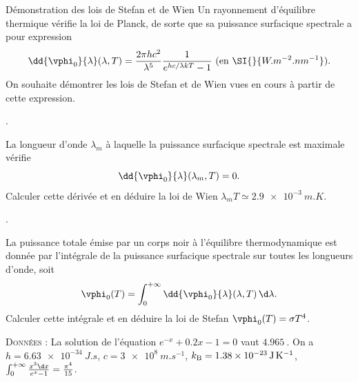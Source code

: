 \begin{exo}[PC][3][TD]{Démonstration des lois de Stefan et de Wien}
  Un rayonnement d'équilibre thermique vérifie la loi de Planck, de sorte que sa puissance surfacique spectrale  a pour expression 
  \begin{equation}
    \dd{\vphi_0}{\lambda}(\lambda, T) = \frac{2\pi hc^2}{\lambda^5} \frac{1}{e^{hc/\lambda kT}-1}~\text{(en $\SI{}{W.m^{-2}.nm^{-1}}$)}.
  \end{equation}
  On souhaite démontrer les lois de Stefan et de Wien vues en cours à partir de cette expression.
  \begin{quest}
    \item	{}. 
    
    La longueur d'onde $\lambda_m$ à laquelle la puissance surfacique spectrale est maximale vérifie 
    \begin{equation}
      \dd{\vphi_0}{\lambda}(\lambda_m, T) = 0.
    \end{equation}
    Calculer cette dérivée et en déduire la loi de Wien $\lambda_m T \simeq \SI{2.9e-3}{m.K}$.
    \item {}. 
    
    La puissance totale émise par un corps noir à l'équilibre thermodynamique est donnée par l'intégrale de la puissance surfacique spectrale sur toutes les longueurs d'onde, soit 
    \begin{equation}
      \vphi_0(T) = \int_0^{+\infty} \dd{\vphi_0}{\lambda}(\lambda, T) \,\d \lambda.
    \end{equation}
    Calculer cette intégrale et en déduire la loi de Stefan $\vphi_0(T) = \sigma T^4$.
  \end{quest}
  \textsc{Données} : La solution de l'équation $e^{-x} + \num{0.2} x -1 =0$ vaut $\SI{4.965}{}$.  On a $h = \SI{6.63e-34}{J.s}$, $c = \SI{3e8}{m.s^{-1}}$, $k_{\rm B} = \SI{1.38e-23}{J.K^{-1}}$, $\int_{0}^{+\infty} \frac{x^3 \d x }{e^x-1} = \frac{\pi^4}{15}$. 
\end{exo}

